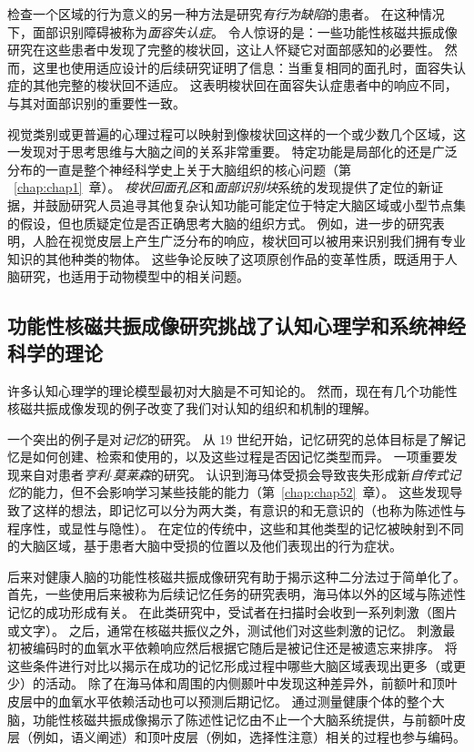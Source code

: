 检查一个区域的行为意义的另一种方法是研究\textit{有行为缺陷}的患者。
在这种情况下，面部识别障碍被称为\textit{面容失认症}。
令人惊讶的是：一些功能性核磁共振成像研究在这些患者中发现了完整的梭状回，这让人怀疑它对面部感知的必要性。 
然而，这里也使用适应设计的后续研究证明了信息：当重复相同的面孔时，面容失认症的其他完整的梭状回不适应。 
这表明梭状回在面容失认症患者中的响应不同，与其对面部识别的重要性一致。


视觉类别或更普遍的心理过程可以映射到像梭状回这样的一个或少数几个区域，这一发现对于思考思维与大脑之间的关系非常重要。
特定功能是局部化的还是广泛分布的一直是整个神经科学史上关于大脑组织的核心问题（第 ~\ref{chap:chap1}~章）。 
\textit{梭状回面孔区}和\textit{面部识别块}系统的发现提供了定位的新证据，并鼓励研究人员追寻其他复杂认知功能可能定位于特定大脑区域或小型节点集的假设，但也质疑定位是否正确思考大脑的组织方式。
例如，进一步的研究表明，人脸在视觉皮层上产生广泛分布的响应，梭状回可以被用来识别我们拥有专业知识的其他种类的物体。
这些争论反映了这项原创作品的变革性质，既适用于人脑研究，也适用于动物模型中的相关问题。



\subsection{功能性核磁共振成像研究挑战了认知心理学和系统神经科学的理论}

许多认知心理学的理论模型最初对大脑是不可知论的。 
然而，现在有几个功能性核磁共振成像发现的例子改变了我们对认知的组织和机制的理解。


一个突出的例子是对\textit{记忆}的研究。
从 19 世纪开始，记忆研究的总体目标是了解记忆是如何创建、检索和使用的，以及这些过程是否因记忆类型而异。 
一项重要发现来自对患者\textit{亨利$\cdot$莫莱森}的研究。 
认识到海马体受损会导致丧失形成新\textit{自传式记忆}的能力，但不会影响学习某些技能的能力（第~\ref{chap:chap52}~章）。
这些发现导致了这样的想法，即记忆可以分为两大类，有意识的和无意识的（也称为陈述性与程序性，或显性与隐性）。
在定位的传统中，这些和其他类型的记忆被映射到不同的大脑区域，基于患者大脑中受损的位置以及他们表现出的行为症状。


后来对健康人脑的功能性核磁共振成像研究有助于揭示这种二分法过于简单化了。
首先，一些使用后来被称为后续记忆任务的研究表明，海马体以外的区域与陈述性记忆的成功形成有关。
在此类研究中，受试者在扫描时会收到一系列刺激（图片或文字）。
之后，通常在核磁共振仪之外，测试他们对这些刺激的记忆。
刺激最初被编码时的血氧水平依赖响应然后根据它随后是被记住还是被遗忘来排序。
将这些条件进行对比以揭示在成功的记忆形成过程中哪些大脑区域表现出更多（或更少）的活动。
除了在海马体和周围的内侧颞叶中发现这种差异外，前额叶和顶叶皮层中的血氧水平依赖活动也可以预测后期记忆。 
通过测量健康个体的整个大脑，功能性核磁共振成像揭示了陈述性记忆由不止一个大脑系统提供，与前额叶皮层（例如，语义阐述）和顶叶皮层（例如，选择性注意）相关的过程也参与编码。


